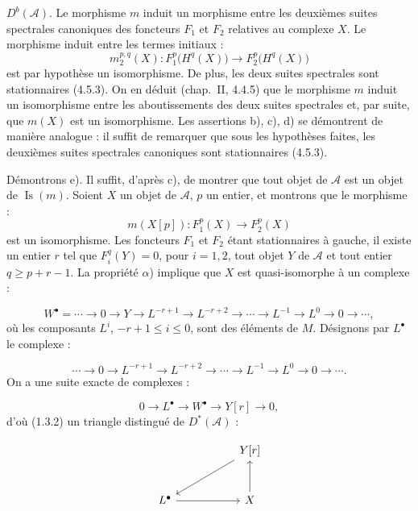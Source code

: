 \clearpage
{}%
\begingroup\small\setlength{\parskip}{0pt}\setlength{\emergencystretch}{1.5em}
\setlength{\abovedisplayskip}{4pt plus 2pt minus 2pt}%
\setlength{\belowdisplayskip}{4pt plus 2pt minus 2pt}%

\noindent $D^b(\mathcal A)$. Le morphisme $m$ induit un morphisme entre les
deuxièmes suites spectrales canoniques des foncteurs $F_1$ et $F_2$
relatives au complexe $X$. Le morphisme induit entre les termes initiaux :
\[
m_2^{p,q}(X)\colon F_1^p\bigl(H^q(X)\bigr)
\longrightarrow F_2^p\bigl(H^q(X)\bigr)
\]
est par hypothèse un isomorphisme. De plus, les deux suites spectrales sont
stationnaires (4.5.3). On en déduit (chap.~II, 4.4.5) que le morphisme $m$
induit un isomorphisme entre les aboutissements des deux suites spectrales
et, par suite, que $m(X)$ est un isomorphisme. Les assertions b), c), d) se
démontrent de manière analogue : il suffit de remarquer que sous les
hypothèses faites, les deuxièmes suites spectrales canoniques sont
stationnaires (4.5.3).

Démontrons e). Il suffit, d'après c), de montrer que tout objet de
$\mathcal A$ est un objet de $\operatorname{Is}(m)$. Soient $X$ un objet de
$\mathcal A$, $p$ un entier, et montrons que le morphisme :
\[
m(X[p])\colon F_1^p(X)\longrightarrow F_2^p(X)
\]
est un isomorphisme. Les foncteurs $F_1$ et $F_2$ étant stationnaires à
gauche, il existe un entier $r$ tel que $F_i^q(Y)=0$, pour $i=1,2$, tout
objet $Y$ de $\mathcal A$ et tout entier $q\geq p+r-1$. La propriété
$\alpha$) implique que $X$ est quasi-isomorphe à un complexe :

\[
W^\bullet=
\cdots\longrightarrow0\longrightarrow Y\longrightarrow L^{-r+1}
\longrightarrow L^{-r+2}\longrightarrow\cdots\longrightarrow L^{-1}
\longrightarrow L^0\longrightarrow0\longrightarrow\cdots,
\]
où les composants $L^i$, $-r+1\leq i\leq0$, sont des éléments de $M$.
Désignons par $L^\bullet$ le complexe :

\[
\cdots\longrightarrow0\longrightarrow L^{-r+1}
\longrightarrow L^{-r+2}\longrightarrow\cdots\longrightarrow L^{-1}
\longrightarrow L^0\longrightarrow0\longrightarrow\cdots.
\]
On a une suite exacte de complexes :

\[
0\longrightarrow L^\bullet\longrightarrow W^\bullet
\longrightarrow Y[r]\longrightarrow0,
\]
d'où (1.3.2) un triangle distingué de $D^*(\mathcal A)$ :

\[
\begin{tikzcd}[column sep=5.2em,row sep=2.8em]
{} & Y[r] \arrow[dl] \\
L^\bullet \arrow[r] & X \arrow[u]
\end{tikzcd}
\]
\endgroup
